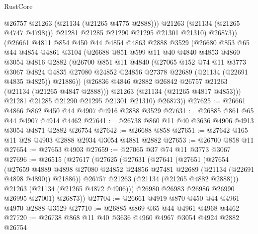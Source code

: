 \begin{lexlean}{RustCore}
\begin{coremodule}
                @26757
                @21263
                (@21134 (@21265 @4775 @2888)))
              @21263
              (@21134 (@21265 @4747 @4798)))
            @21281
            @21285
            @21290
            @21295
            @21301
            @21310)
          @26873))
      (@26661
        @4811
        @854
        @450
        @44
        @4854
        @4863
        @2888
        @3529
        (@26680
          @853
          @65
          @44
          @4854
          @4861
          @3104
          (@26688
            @851
            @599
            @11
            @40
            @4840
            @4853
            @4860
            @3054
            @4816
            @2882
            (@26700
              @851
              @11
              @4840
              (@27065
                @152
                @74
                @11
                @3773
                @3067
                @4824
                @4835
                @27080
                @24852
                @24856
                @27378
                @22689
                (@21134 (@22691 @4835 @4825))
                @21886))
            (@26836 @4846 @2882 @26842 @26757 @21263 (@21134 (@21265 @4847 @2888)))
            @21263
            (@21134 (@21265 @4817 @4853)))
          @21281
          @21285
          @21290
          @21295
          @21301
          @21310)
        @26873))
@27625 := @26661 @4866 @862 @450 @44 @4907 @4916 @2888 @3529
@27631 := @26885 @861 @65 @44 @4907 @4914 @4462
@27641 := @26738 @860 @11 @40 @3636 @4906 @4913 @3054 @4871 @2882 @26754
@27642 := @26688 @858
@27651 := @27642 @165 @11 @28 @4903 @2888 @2934 @3054 @4881 @2882
@27653 := @26700 @858 @11
@27654 := @27653 @4903
@27659 := @27065 @37 @74 @11 @3773 @3067
@27696 := @26515
    (@27617
      (@27625
        (@27631
          (@27641
            (@27651
              (@27654
                (@27659
                  @4889
                  @4898
                  @27080
                  @24852
                  @24856
                  @27481
                  @22689
                  (@21134 (@22691 @4898 @4890))
                  @21886))
              @26757
              @21263
              (@21134 (@21265 @4882 @2888)))
            @21263
            (@21134 (@21265 @4872 @4906)))
          @26980
          @26983
          @26986
          @26990
          @26995
          @27001)
        @26873))
@27704 := @26661 @4919 @870 @450 @44 @4961 @4970 @2888 @3529
@27710 := @26885 @869 @65 @44 @4961 @4968 @4462
@27720 := @26738 @868 @11 @40 @3636 @4960 @4967 @3054 @4924 @2882 @26754

\end{coremodule}
\end{lexlean}
